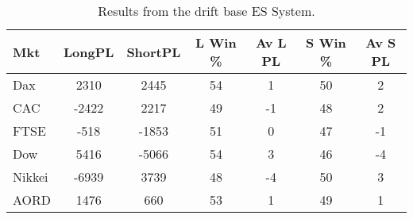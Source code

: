 \begin{table}[ht]
\centering
\caption[Results from the drift base ES System]{Results from the drift base ES System.} 
\label{tab:es_drift_sys}
\begin{tabular}{lcccccc}
  \toprule Mkt & LongPL & ShortPL & L Win \% & Av L PL & S Win \% & Av S PL \\ 
  \midrule Dax & 2310 & 2445 & 54 & 1 & 50 & 2 \\ 
  CAC & -2422 & 2217 & 49 & -1 & 48 & 2 \\ 
  FTSE & -518 & -1853 & 51 & 0 & 47 & -1 \\ 
  Dow & 5416 & -5066 & 54 & 3 & 46 & -4 \\ 
  Nikkei & -6939 & 3739 & 48 & -4 & 50 & 3 \\ 
  AORD & 1476 & 660 & 53 & 1 & 49 & 1 \\ 
   \bottomrule \end{tabular}
\end{table}
